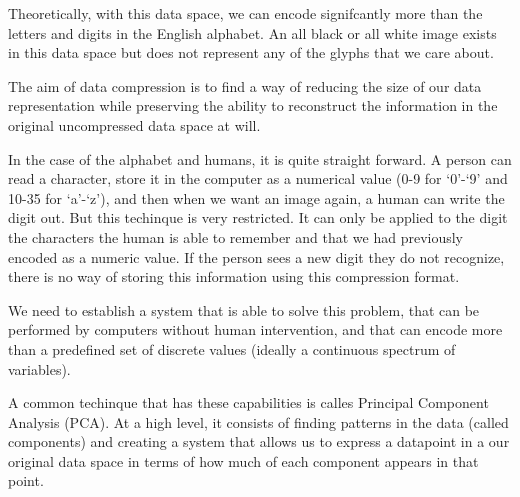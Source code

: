 \documentclass[12pt]{report}
\begin{document}
            Theoretically, with this data space, we can encode signifcantly more than the letters and digits in the English alphabet. An all black or all white image exists in this data space but does not represent any of the glyphs that we care about.

            The aim of data compression is to find a way of reducing the size of our data representation while preserving the ability to reconstruct the information in the original uncompressed data space at will.

            In the case of the alphabet and humans, it is quite straight forward. A person can read a character, store it in the computer as a numerical value (0-9 for `0'-`9' and 10-35 for `a'-`z'), and then when we want an image again, a human can write the digit out. But this techinque is very restricted. It can only be applied to the digit the characters the human is able to remember and that we had previously encoded as a numeric value. If the person sees a new digit they do not recognize, there is no way of storing this information using this compression format.

            We need to establish a system that is able to solve this problem, that can be performed by computers without human intervention, and that can encode more than a predefined set of discrete values (ideally a continuous spectrum of variables).

            A common techinque that has these capabilities is calles Principal Component Analysis (PCA). At a high level, it consists of finding patterns in the data (called components) and creating a system that allows us to express a datapoint in a our original data space in terms of how much of each component appears in that point.


            
\end{document}
